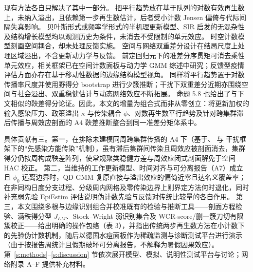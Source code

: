 \documentclass[11pt,a4paper]{ctexart}
\theoremstyle{definition}
\begin{document}
现有方法各自只解决了其中一部分。\citet{feng2024parallel} 把平行趋势放在基于队列的对数有效再生数上，未纳入溢出，且依赖第一步再生数估计，后者受小计数 Jensen 偏倚与代际间隔失真影响\citep{gostic2020practical}。
贝叶斯形式\citep{flaxman2020npi,brauner2021npi,bhatt2023semimech}或频率学形式\citep{bong2024frequentist,bong2024augmented}的半机理更新模型、SIR 启发的无混杂性\citep{callaway2023pandemic}及结构增长模型\citep{chernozhukov2021masks}均以观测历史为条件，未消去不受限制的单元效应。
时空计数模型\citep{held2005hhh,meyer2014powerlaw,alaimo2024poissonar}刻画空间耦合，却未处理反馈实施。
空间与网络双重差分设计\citep{kosfeld2021spatial,butts2021spatial,forastiere2021network,xu2023did,sun2025didnetwork}在结局尺度上处理区域溢出，不含更新动力学与反馈。
前定回归元下的准差分序贯矩可消去乘性单元效应\citep{chamberlain1992sequential,wooldridge1997multiplicative,windmeijer2000moment,blundell2002count}，相关框架已在空间计数面板与动力学 GMM 综述中研究\citep{windmeijer2008gmm,abdelmoula2007spatial,glaser2022spatial}；反馈型疫情评估方面亦存在基于移动性数据的边缘结构模型视角\citep{bonvini2022mobility}。\citet{feng2024parallel} 同样将平行趋势置于对数传播率尺度并使用野得分 bootstrap 进行少簇推断；干扰下双重差分近期亦围绕空间与社会溢出\citep{zhao2021interdependent}、双重稳健估计\citep{hettinger2025doubly}与动态网络效应\citep{xu2023did,xu2026dynamic}不断拓展。\citet{bong2024frequentist} 命题 5.8 也给出了与下文相似的鞅差得分论证。因此，本文的增量为组合式而非从零创立：将更新加权的输入感染压力、政策溢出 $\kappa$ 与传染耦合 $\phi$、对数再生数平行趋势及针对跨集群滞后传播与周效应剖面的 A4 鞅差推断整合到同一准差分矩体系中。

具体贡献有三。第一，在排除未建模同周跨集群传播的 A4 下（基于\citealp{halloran1995causal}、\citealp{tchetgen2012interference} 与 \citealp{ogburn2014causal} 干扰框架下的“先感染方能传染”机制），虽有滞后集群间传染且周效应被剖面消去，集群得分仍按周构成鞅差阵列，使常规聚类稳健方差与周效应闭式剖面解免于空间 HAC 校正。
第二，当维持的工作更新模型、时间对齐与可分离报告（A7）成立且 $\phi_0$ 远离边界时，QD-GMM 复原直接与溢出效应的偏倚近零且达名义覆盖率；在非同构日度分支过程、分级周内网格及零传染边界上则界定方法何时退化，同时补充弱先验 EpiEstim 评估说明伪计数先验与反馈对传统比较量的各自作用。
第三，本文围绕多根与边缘识别组合并校准既有的检验与推断工具——剖面方程检验、满秩得分型 $J_{LM}$、Stock--Wright 弱识别集合及 WCR-score/删一簇刀切有限簇校正——给出明确的操作包络（表 3），并指出传统两步再生数方法在小计数下的先验伪计数机制，随后以德国水痘面板作为稀疏监测与诊断测试平台进行演示（由于按报告周统计且假期破坏可分离报告，不解释为暑假因果效应）。第~\ref{s:methods}--\ref{s:discussion} 节依次展开模型、模拟、说明性测试平台与讨论；网络附录 A--F 提供补充材料。
\end{document}
